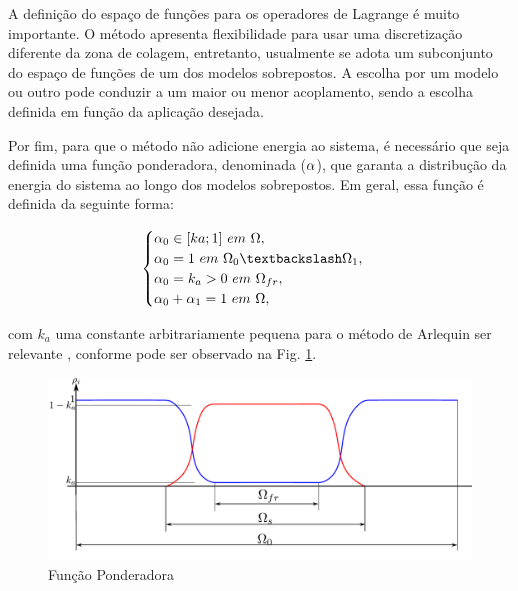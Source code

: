 \documentclass[tese_patricia]{subfiles}
\begin{document}
A definição do espaço de funções para os operadores de Lagrange é muito importante. O método apresenta flexibilidade para usar uma discretização diferente da zona de colagem, entretanto, usualmente se adota um subconjunto do espaço de funções de um dos modelos sobrepostos. A escolha por um modelo ou outro pode conduzir a um maior ou menor acoplamento, sendo a escolha definida em função da aplicação desejada. 

Por fim, para que o método não adicione energia ao sistema, é necessário que seja definida uma função ponderadora, denominada ($\alpha$), que garanta a distribução da energia do sistema ao longo dos modelos sobrepostos. Em geral, essa função é definida da seguinte forma:


\begin{align}
	\begin{cases} \arlequinWFGlobal \in [ka;1] \ em \ \domain, \\ 
	\arlequinWFGlobal = 1 \ em \ \globalModel \textbackslash \localModel,  \\
	\arlequinWFGlobal  = k_a > 0 \ em \ \freeZone, \\
	\arlequinWFGlobal + \arlequinWFLocal = 1 \ em \ \domain,
	\end{cases} \label{eq:funcPondeArleq}
\end{align}

\noindent com $k_a$ uma constante arbitrariamente pequena para o método de Arlequin ser relevante \cite{Dhia:2008}, conforme pode ser observado na Fig. \ref{fig:funcPondArlq}.


\begin{figure}[htb!]
	\centering 
	\includegraphics[scale=0.6,trim=0cm 0cm 0cm 0.0cm, clip=true]{Imagens/Cap6/funcPondArlq.pdf}	
	\caption{Função Ponderadora}
	\label{fig:funcPondArlq}
\end{figure}
\end{document}
